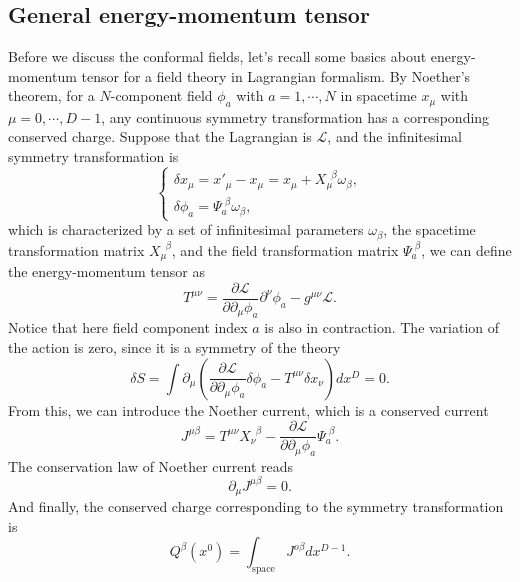 \documentclass[graybox,envcountchap,sectrefs]{svmono}
\begin{document}
\subsection{General energy-momentum tensor}
Before we discuss the conformal fields, let's recall some basics about energy-momentum tensor for a field theory in Lagrangian formalism. 
By Noether's theorem, for a $N$-component field $\phi_a$ with $a=1,\cdots ,N$ in spacetime  $x_{\mu}$ with $\mu=0,\cdots,D-1$, any continuous symmetry transformation has a corresponding conserved charge. 
Suppose that the Lagrangian is $\mathcal{L}$, and the infinitesimal symmetry transformation is
\begin{equation}
\begin{cases}
	\delta x_{\mu}={x'}_{\mu}-x_{\mu}=x_{\mu}+X_{\mu}^{\,\,\,\beta}\omega_{\beta},\\
	\delta\phi_a=\Psi_{a}^{\,\,\beta}\omega_{\beta},
\end{cases}	
\end{equation}
which is characterized by a set of infinitesimal parameters $\omega_{\beta}$, the spacetime transformation matrix $X_{\mu}^{\,\,\,\beta}$, and the field transformation matrix $\Psi_{a}^{\,\,\beta}$, we can define the energy-momentum tensor as
\begin{equation}\label{eq:EMtensor}
T^{\mu\nu}=\frac{\partial \mathcal{L}}{\partial \partial_{\mu}\phi_a}\partial^{\nu}\phi_a-g^{\mu\nu}\mathcal{L}.	
\end{equation}
Notice that here field component index $a$ is also in contraction. 
The variation of the action is zero, since it is a symmetry of the theory 
\begin{equation}
\delta S=\int 	\partial_{\mu}\left(\frac{\partial\mathcal{L}}{\partial \partial_{\mu}\phi_a}\delta\phi_a-T^{\mu\nu}\delta x_{\nu}\right)dx^D=0.
\end{equation}
From this, we can introduce the Noether current, which is a conserved current
\begin{equation}
J^{\mu\beta}=T^{\mu\nu}X_{\nu}^{\,\,\,\beta}	-\frac{\partial\mathcal{L}}{\partial \partial_{\mu}\phi_a}\Psi_{a}^{\,\,\beta}.
\end{equation}
The conservation law of Noether current reads
\begin{equation}
\partial_{\mu}J^{\mu\beta}=0.	
\end{equation}
And finally, the conserved charge corresponding to the symmetry transformation is
\begin{equation}
Q^{\beta}(x^0)=\int_{\mathrm{space}} J^{o\beta}
dx^{D-1}.
\end{equation}
\end{document}
